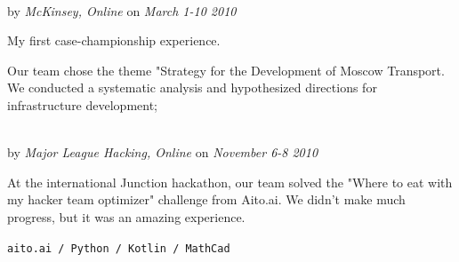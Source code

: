 \clearpage
\framebreak
\framebreak

 \\
by \textit{McKinsey, Online}
on \textit{March 1-10 2010}
\SmallSep

My first case-championship experience.

Our team chose the theme "Strategy for the Development of Moscow Transport. We conducted a systematic analysis and hypothesized directions for infrastructure development;

\SmallSep

 \\
by \textit{Major League Hacking, Online}
on \textit{November 6-8 2010}
\SmallSep

At the international Junction hackathon, our team solved the "Where to eat with my hacker team optimizer" challenge from Aito.ai. We didn't make much progress, but it was an amazing experience.

\texttt{aito.ai / Python / Kotlin / MathCad}

\SmallSep

\Sep
